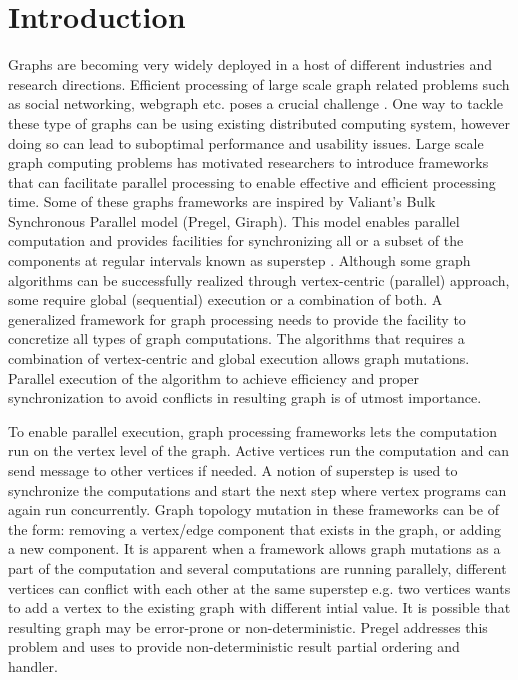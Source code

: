 \section{Introduction}
\label{sec:intro}

Graphs are becoming very widely deployed in a host of different industries and research directions. Efficient processing of large scale graph related problems such as social networking, webgraph etc. poses a crucial challenge \cite{Pregel2010}. One way to tackle these type of graphs can be using existing distributed computing system, however doing so can lead to suboptimal performance and usability issues. Large scale graph computing problems has motivated researchers to introduce frameworks \cite{Pregel2010,Graphlab2012,Zuhair:Mizan,GPS2013} that can facilitate parallel processing to enable effective and efficient processing time. Some of these graphs frameworks are inspired by Valiant's Bulk Synchronous Parallel model (Pregel, Giraph). This model enables parallel computation and provides facilities for synchronizing all or a subset of the components at regular intervals known as superstep \cite{Valiant1990}. Although some graph algorithms can be successfully realized through vertex-centric (parallel) approach, some require global (sequential) execution or a combination of both. A generalized framework for graph processing needs to provide the facility to concretize all types of graph computations. The algorithms that requires a combination of vertex-centric and global execution allows graph mutations. Parallel execution of the algorithm to achieve efficiency and proper synchronization to avoid conflicts in resulting graph is of utmost importance.


To enable parallel execution, graph processing frameworks lets the computation run on the vertex level of the graph. Active vertices run the computation and can send message to other vertices if needed. A notion of superstep is used to synchronize the computations and start the next step where vertex programs can again run concurrently. Graph topology mutation in these frameworks can be of the form: removing a vertex/edge component that exists in the graph, or adding a new component. It is apparent when a framework allows graph mutations as a part of the computation and several computations are running parallely, different vertices can conflict with each other at the same superstep e.g. two vertices wants to add a vertex to the existing graph with different intial value. It is possible that resulting graph may be error-prone or non-deterministic. Pregel \cite{Pregel2010} addresses this problem and uses to provide non-deterministic result partial ordering and handler.


